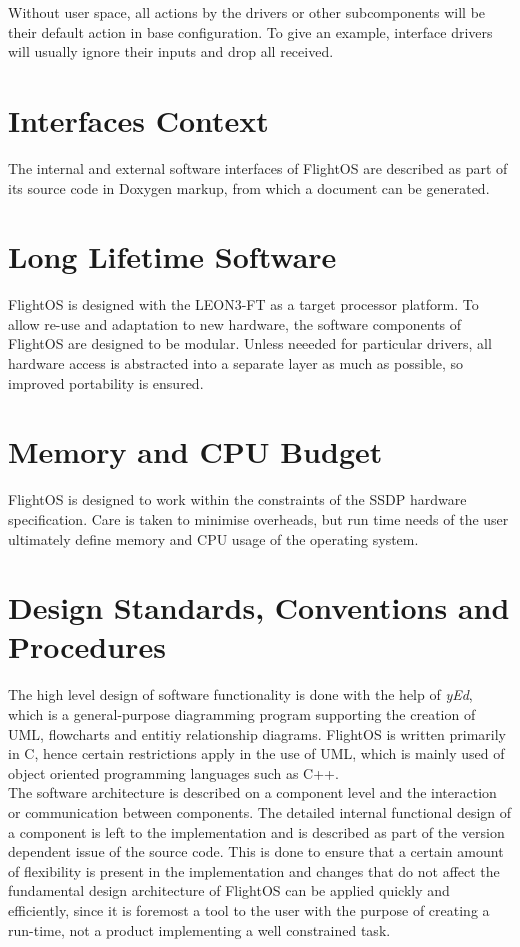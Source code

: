 Without user space, all actions by the drivers or other subcomponents will be
their default action in base configuration. To give an example, interface
drivers will usually ignore their inputs and drop all received.




\section{Interfaces Context}

The internal and external software interfaces of FlightOS are described as part
of its source code in Doxygen markup, from which a document can be generated.

\section{Long Lifetime Software}

FlightOS is designed with the \gls{LEON3-FT} as a target processor platform.
To allow re-use and adaptation to new hardware, the software components of
FlightOS are designed to be modular. Unless neeeded for particular drivers, all
hardware access is abstracted into a separate layer as much as possible, so
improved portability is ensured.


\section{Memory and CPU Budget}

FlightOS is designed to work within the constraints of the \gls{SSDP} hardware
specification. Care is taken to minimise overheads, but run time needs of the
user ultimately define memory and CPU usage of the operating system.


\section{Design Standards, Conventions and Procedures}

The high level design of software functionality is done with the help of
\emph{yEd}, which is a general-purpose diagramming program supporting the
creation of UML, flowcharts and entitiy relationship diagrams.
FlightOS is written primarily in C, hence certain restrictions apply in the use of
UML, which is mainly used of object oriented programming languages such as C++.
\\

The software architecture is described on a component level and the interaction
or communication between components. The detailed internal functional design of
a component is left to the implementation and is described as part of the
version dependent issue of the source code. This is done to ensure that a
certain amount of flexibility is present in the implementation and changes that
do not affect the fundamental design architecture of FlightOS can be applied
quickly and efficiently, since it is foremost a tool to the user with the
purpose of creating a run-time, not a product implementing a well constrained
task.\\

